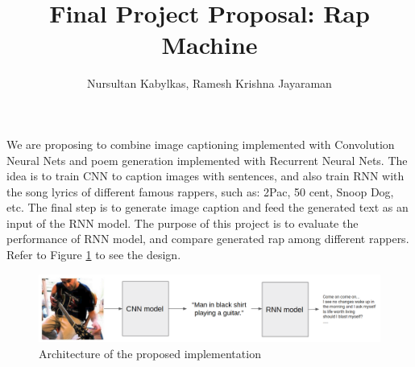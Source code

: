 \documentclass[a4paper,10pt]{article}
\title{Final Project Proposal: Rap Machine}
\author{Nursultan Kabylkas, Ramesh Krishna Jayaraman}
\begin{document}
\maketitle

We are proposing to combine image captioning implemented with Convolution Neural Nets and poem generation implemented with Recurrent Neural Nets. The idea is to train CNN to caption images with sentences, and also train RNN with the song lyrics of different famous rappers, such as: 2Pac, 50 cent, Snoop Dog, etc. The final step is to generate image caption and feed the generated text as an input of the RNN model. The purpose of this project is to evaluate the performance of RNN model, and compare generated rap among different rappers. Refer to Figure \ref{fig:architecture} to see the design.\\

\begin{figure}[h]
\includegraphics[scale=0.18]{figure1}
\caption{Architecture of the proposed implementation}
\label{fig:architecture}
\end{figure}
\end{document}

